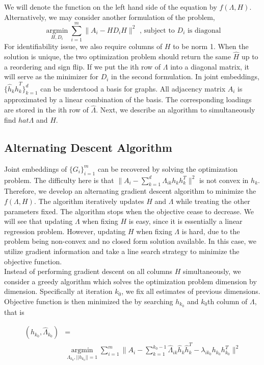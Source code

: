 \documentclass[10pt,journal,compsoc]{IEEEtran}
\begin{document}
\noindent  We will denote the function on the left hand side of the equation by $f(\Lambda,H)$. Alternatively, we may consider another formulation of the problem, 
\[  \underset{H,D_i}{\operatorname{argmin}} \sum\limits_{i=1}^{m} \| A_i- H D_i H \|  ^2  \text{ , subject to $D_i$ is diagonal}\]
For identifiability issue, we also require columns of $H$ to be norm 1. When the solution is unique, the two optimization problem should return the same $\hat{H}$ up to a reordering and sign flip. If we put the ith row of $\Lambda$ into a diagonal matrix, it will serve as the minimizer for $D_i$ in the second formulation. In joint embeddings, $\{\hat{h}_k \hat{h}_k^T\}_{k=1}^d$ can be understood a basis for graphs. All adjacency matrix $A_i$ is approximated by a linear combination of the basis. The corresponding loadings are stored in the ith row of $\hat{\Lambda}$. Next, we describe an algorithm to simultaneously find $hat{\Lambda}$ and $\hat{H}$.  

\subsection{Alternating Descent Algorithm}
\noindent Joint embeddings of $\{G_i \} _{i=1}^{m}$ can be recovered by solving the optimization problem. The difficulty here is that $\| A_i- \sum\limits_{k=1}^{d} \Lambda_{ik} h_k h_k^T \|  ^2$ is not convex in $h_k$. Therefore, we develop an alternating gradient descent algorithm to minimize the $f(\Lambda,H)$. The algorithm iteratively updates $H$ and $\Lambda$ while treating the other parameters fixed. The algorithm stops when the objective cease to decrease. We will see that updating $\Lambda$ when fixing $H$ is easy, since it is essentially a linear regression problem. However, updating $H$ when fixing $\Lambda$ is hard, due to the problem being non-convex and no closed form solution available. In this case, we utilize gradient information and take a line search strategy to minimize the objective function.  \\

\noindent Instead of performing gradient descent on all columns $H$ simultaneously, we consider a greedy algorithm which solves the optimization problem dimension by dimension. Specifically at iteration $k_0$, we fix all estimates of previous dimensions. Objective function is then minimized the  by searching $h_{k_0}$ and $k_0$th column of $\Lambda$, that is

\begin{align*}(\hat{h}_{k_0},\hat{\Lambda}_{k_0}) &= \\
&\underset{\Lambda_{k_0},||h_{k_0}||=1}{\operatorname{argmin}} \sum\limits_{i=1}^{m} \| A_i- \sum\limits_{k=1}^{k_0-1} \hat{\Lambda}_{ik} \hat{h}_{k} \hat{h}_{k}^T -\lambda_{ik_0} h_{k_0} h_{k_0}^T\|  ^2
\end{align*} 
\end{document}
